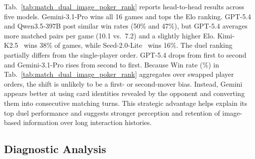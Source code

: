 \documentclass{llmxive}
\begin{document}
Tab.~\ref{tab:match_dual_image_poker_rank} reports head-to-head results across five models. Gemini-3.1-Pro wins all 16 games and tops the Elo ranking. GPT-5.4 and Qwen3.5-397B post similar win rates (50\% and 47\%), but GPT-5.4 averages more matched pairs per game (10.1 vs.\ 7.2) and a slightly higher Elo. Kimi-K2.5~\citep{team2026kimi} wins 38\% of games, while Seed-2.0-Lite~\citep{seed2_lite} wins 16\%.
%
The duel ranking partially differs from the single-player order. GPT-5.4 drops from first to second and Gemini-3.1-Pro rises from second to first. Because Win rate (\%) in Tab.~\ref{tab:match_dual_image_poker_rank} aggregates over swapped player orders, the shift is unlikely to be a first- or second-mover bias. Instead, Gemini appears better at using card identities revealed by the opponent and converting them into consecutive matching turns. This strategic advantage helps explain its top duel performance and suggests stronger perception and retention of image-based information over long interaction histories.



\subsection{Diagnostic Analysis}
\label{sec:diagnostic_analysis}



\end{document}
